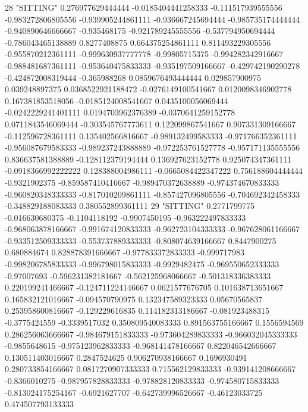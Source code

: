 28 "SITTING" 0.276977629444444 -0.0185404441258333 -0.111517939555556 -0.983272806805556 -0.939905244861111 -0.936667245694444 -0.985735174444444 -0.940890646666667 -0.935468175 -0.921789245555556 -0.537794950694444 -0.786043465138889 0.8277408875 0.664375254861111 0.811493229305556 -0.955870212361111 -0.999630937777778 -0.99805715375 -0.994282342916667 -0.988481687361111 -0.953640475833333 -0.935197509166667 -0.429742190290278 -0.424872008319444 -0.365988268 0.0859676493444444 0.029857900975 0.039248897375 0.0368522921188472 -0.0276149100541667 0.0120098346902778 0.167381853518056 -0.0185124008541667 0.0435100056069444 -0.0242229241401111 0.0194703962376389 -0.0370641259152778 0.0711843546069444 -0.303545767773611 0.122099867541667 0.907331309166667 -0.112596728361111 0.135402566816667 -0.989132499583333 -0.971766352361111 -0.956087679583333 -0.989237243888889 -0.972253761527778 -0.957171135555556 0.836637581388889 -0.128112379194444 0.136927623152778 0.925074347361111 -0.0918366992222222 0.128388004986111 -0.0665084422347222 0.756188604444444 -0.9321902375 -0.859587410416667 -0.989470372638889 -0.974374670833333 -0.960820348333333 -0.817010209861111 -0.857427096805556 -0.704692342458333 -0.348829188083333 0.380552899361111
29 "SITTING" 0.2771799775 -0.016630680375 -0.1104118192 -0.9907450195 -0.963222497833333 -0.968063878166667 -0.991674120833333 -0.962723104333333 -0.967628061166667 -0.933512509333333 -0.553737889333333 -0.808074639166667 0.8447900275 0.680884674 0.828878391666667 -0.977833372833333 -0.999717983 -0.998206785833333 -0.996798015833333 -0.9929482475 -0.969550652333333 -0.97007693 -0.596231382181667 -0.562125968066667 -0.501318336383333 0.220199241466667 -0.124711224146667 0.0621577676705 0.101638713651667 0.165832121016667 -0.094570790975 0.132347589323333 0.05670565837 0.253958600816667 -0.129229616835 0.114182313186667 -0.081923488315 -0.3775424559 -0.3339517032 0.350809540083333 0.891563755166667 0.1556594569 0.286256063666667 -0.984679151833333 -0.973604289833333 -0.966032045333333 -0.9855648615 -0.975123962833333 -0.968141478166667 0.822046542666667 0.130511403016667 0.2847524625 0.906270938166667 0.1696930491 0.280733854166667 0.0817270907333333 0.715562129833333 -0.939141208666667 -0.8366010275 -0.987957828833333 -0.978828120833333 -0.974580715833333 -0.813024175254167 -0.6921627707 -0.642739996526667 -0.46123033725 0.474507793133333
